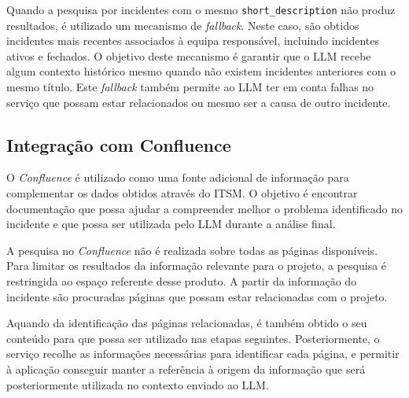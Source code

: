 		
		Quando a pesquisa por incidentes com o mesmo \texttt{short\_description} não produz resultados, é utilizado um mecanismo de \textit{fallback}. Neste caso, são obtidos incidentes mais recentes associados à equipa responsável, incluindo incidentes ativos e fechados. O objetivo deste mecanismo é garantir que o \gls{LLM} recebe algum contexto histórico mesmo quando não existem incidentes anteriores com o mesmo título. Este \textit{fallback} também permite ao \gls{LLM} ter em conta falhas no serviço que possam estar relacionados ou mesmo ser a causa de outro incidente.
			
			
	\subsection{Integração com Confluence}
		
		
		O \textit{Confluence} é utilizado como uma fonte adicional de informação para complementar os dados obtidos através do \gls{ITSM}. O objetivo é encontrar documentação que possa ajudar a compreender melhor o problema identificado no incidente e que possa ser utilizada pelo \gls{LLM} durante a análise final.
		
		A pesquisa no \textit{Confluence} não é realizada sobre todas as páginas disponíveis. Para limitar os resultados da informação relevante para o projeto, a pesquisa é restringida ao espaço referente desse produto. A partir da informação do incidente são procuradas páginas que possam estar relacionadas com o projeto.
		
		Aquando da identificação das páginas relacionadas, é também obtido o seu conteúdo para que possa ser utilizado nas etapas seguintes. Posteriormente, o serviço recolhe as informações necessárias para identificar cada página, e permitir à aplicação conseguir manter a referência à origem da informação que será posteriormente utilizada no contexto enviado ao \gls{LLM}.
		
